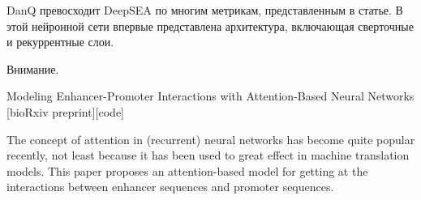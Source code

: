 DanQ превосходит DeepSEA по многим метрикам, представленным в статье. В этой нейронной сети впервые представлена архитектура, включающая сверточные и рекуррентные слои.


Внимание.

Modeling Enhancer-Promoter Interactions with Attention-Based Neural Networks [bioRxiv preprint][code]

The concept of attention in (recurrent) neural networks has become quite popular recently, not least because it has been used to great effect in machine translation models. This paper proposes an attention-based model for getting at the interactions between enhancer sequences and promoter sequences.


